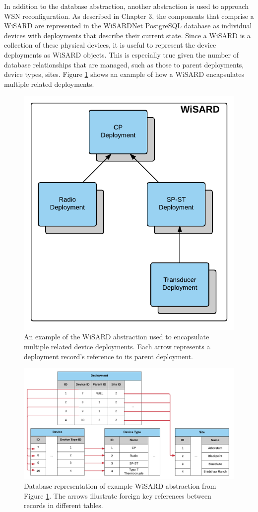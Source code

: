 In addition to the database abstraction, another abstraction is used to approach WSN reconfiguration. As described in Chapter 3, the components that comprise a WiSARD are represented in the WiSARDNet PostgreSQL database as individual devices with deployments that describe their current state. Since a WiSARD is a collection of these physical devices, it is useful to represent the device deployments as WiSARD objects. This is especially true given the number of database relationships that are managed, such as those to parent deployments, device types, sites. Figure \ref{fig:wisard_object} shows an example of how a WiSARD encapsulates multiple related deployments. 

\begin{figure}[H]
	\centering
	\includegraphics[width=.6\textwidth]{figures/wisard_abstraction_example.png}
	\caption{An example of the WiSARD abstraction used to encapsulate multiple related device deployments. Each arrow represents a deployment record's reference to its parent deployment.}
	\label{fig:wisard_object}
\end{figure}

\begin{figure}[H]
	\centering
	\includegraphics[width=\textwidth]{figures/wisard_abstraction_example_database.png}
	\caption{Database representation of example WiSARD abstraction from Figure \ref{fig:wisard_object}. The arrows illustrate foreign key references between records in different tables.}
	\label{fig:wisard_object_database}
\end{figure}

